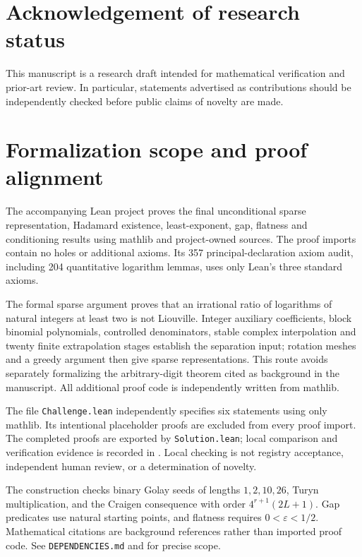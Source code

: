 \documentclass[11pt]{article}
\begin{document}
\section*{Acknowledgement of research status}
This manuscript is a research draft intended for mathematical verification and prior-art review.  In particular, statements advertised as contributions should be independently checked before public claims of novelty are made.


\section*{Formalization scope and proof alignment}
The accompanying Lean project proves the final unconditional sparse
representation, Hadamard existence, least-exponent, gap, flatness and
conditioning results using mathlib and project-owned sources. The proof
imports contain no holes or additional axioms. Its 357 principal-declaration
axiom audit, including 204 quantitative logarithm lemmas, uses only
Lean's three standard axioms.

The formal sparse argument proves that an irrational ratio of logarithms of
natural integers at least two is not Liouville. Integer auxiliary coefficients,
block binomial polynomials, controlled denominators, stable complex
interpolation and twenty finite extrapolation stages establish the separation
input; rotation meshes and a greedy argument then give sparse representations.
This route avoids separately formalizing the arbitrary-digit theorem cited
as background in the manuscript. All additional proof code is independently
written from mathlib.

The file \texttt{Challenge.lean} independently specifies six statements using
only mathlib. Its intentional placeholder proofs are excluded from every
proof import. The completed proofs are exported by \texttt{Solution.lean};
local comparison and verification evidence is recorded in
. Local checking is not registry
acceptance, independent human review, or a determination of novelty.

The construction checks binary Golay seeds of lengths $1,2,10,26$, Turyn
multiplication, and the Craigen consequence with order $4^{r+1}(2L+1)$.
Gap predicates use natural starting points, and flatness requires
$0<\varepsilon<1/2$. Mathematical citations are background references rather
than imported proof code. See \texttt{DEPENDENCIES.md} and
 for precise scope.
\end{document}
